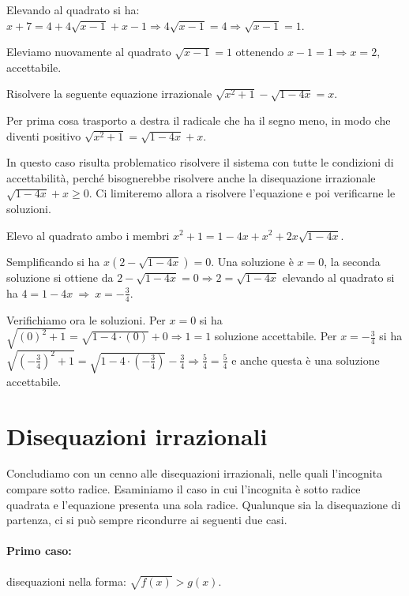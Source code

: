 \begin{exrig}
\begin{esempio}
Elevando al quadrato si ha: $x+7=4+4\sqrt{x-1}+x-1 \Rightarrow 4\sqrt{x-1}=4 \Rightarrow \sqrt{x-1}=1$.

Eleviamo nuovamente al quadrato $\sqrt{x-1}=1$ ottenendo $x-1=1\Rightarrow x=2$, accettabile.
\end{esempio}

\begin{esempio}
Risolvere la seguente equazione irrazionale $\sqrt{x^2+1}-\sqrt{1-4x}=x$.

Per prima cosa trasporto a destra il radicale che ha il segno meno, in modo che diventi positivo $\sqrt{x^2+1}=\sqrt{1-4x}+x$.

In questo caso risulta problematico risolvere il sistema con tutte le condizioni di accettabilità, perché bisognerebbe risolvere anche la disequazione irrazionale $\sqrt{1-4x}+x\ge 0$.
Ci limiteremo allora a risolvere l'equazione e poi verificarne le soluzioni.

Elevo al quadrato ambo i membri $x^2+1=1-4x+x^2+2x\sqrt{1-4x}$.

Semplificando si ha $x(2-\sqrt{1-4x})=0$. Una soluzione è $x=0$, la seconda soluzione si ottiene da $2-\sqrt{1-4x}=0\Rightarrow 2=\sqrt{1-4x}$ elevando al quadrato si ha $4=1-4x\ \Rightarrow \ x=-\frac 3 4$.

Verifichiamo ora le soluzioni. Per $x=0$ si ha $\sqrt{(0)^2+1}=\sqrt{1-4\cdot (0)}+0\Rightarrow 1=1$ soluzione accettabile. Per $x=-\frac 3 4$ si ha $\sqrt{\left(-\frac 3 4\right)^2+1}=\sqrt{1-4\cdot\left(-\frac 3 4\right)}-\frac 3 4\Rightarrow\frac 5 4=\frac 5 4$ e anche questa è una soluzione accettabile.
\end{esempio}
\end{exrig}

\section{Disequazioni irrazionali}
Concludiamo con un cenno alle disequazioni irrazionali, nelle quali l'incognita compare sotto radice. Esaminiamo il caso in cui l'incognita è sotto radice quadrata e l'equazione presenta una sola radice. Qualunque sia la disequazione di partenza, ci si può sempre ricondurre ai seguenti due casi.

\paragraph{Primo caso:} disequazioni nella forma: $ \sqrt{f(x)}>g(x) $.

